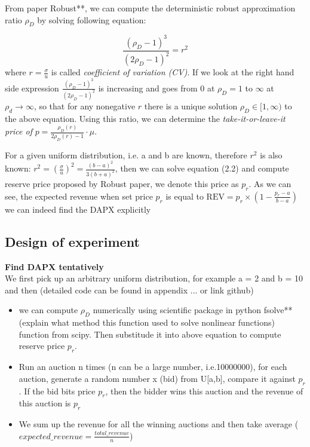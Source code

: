 From paper Robust**, we can compute the deterministic robust approximation ratio $\rho_{D}$ by solving following equation:

\begin{equation}\label{eq:2.2}
\frac {(\rho_{D}-1)^{3}}{(2\rho_{D}-1)^{2}} = r^{2}
\end{equation} 
where $r = \frac{\sigma}{u}$ is called \textit{coefficient of variation (CV)}. If we look at the right hand side expression $\frac {(\rho_{D}-1)^{3}}{(2\rho_{D}-1)^{2}}$ is increasing and goes from 0 at $\rho_{D} = 1$ to $\infty$ at $\rho_{d} \rightarrow \infty$, so that for any nonegative $r$ there is a unique solution $\rho_{D} \in [1,\infty)$ to the above equation. Using this ratio, we can determine the \textit{take-it-or-leave-it price of} $p = \frac{\rho_{D}(r)}{2\rho_{D}(r)-1}\cdot \mu$.

For a given uniform distribution, i.e. a and b are known, therefore $r^{2}$ is also known: $r^{2} = (\frac{\sigma}{u})^{2} = \frac{(b-a)^{2}}{3(b+a)^{2}}$, then we can solve equation (2.2) and compute reserve price proposed by Robust paper, we denote this price as $p_r$. As we can see, the expected revenue when set price $p_r$ is equal to $\text{REV} = p_r\times (1-\frac {p_r-a}{b-a})$ we can indeed find the DAPX explicitly 

\subsection{Design of experiment}
\textbf{Find DAPX tentatively}\\
We first pick up an arbitrary uniform distribution, for example a = 2 and b = 10 and then (detailed code can be found in appendix ... or link github)
\begin{itemize}
	\item we can compute $\rho_{D}$ numerically using scientific package in python fsolve**(explain what method this function used to solve nonlinear functions) function from scipy. Then substitude it into above equation to compute reserve price $p_r$.
	\item Run an auction n times (n can be a large number, i.e.10000000), for each auction, generate a random number x (bid) from U[a,b], compare it against $p_r$. If the bid bits price $p_r$, then the bidder wins this auction and the revenue of this auction is $p_r$ 
	\item We sum up the revenue for all the winning auctions and then take average ($expected\_revenue = \frac{total\_revenue}{n}$)
\end{itemize}

